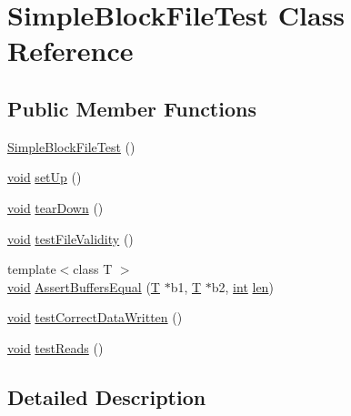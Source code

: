 \hypertarget{class_simple_block_file_test}{}\section{Simple\+Block\+File\+Test Class Reference}
\label{class_simple_block_file_test}
\subsection*{Public Member Functions}
\begin{DoxyCompactItemize}
\item 
\hyperlink{class_simple_block_file_test_ac1cdd7d75ba02dde184a2e5a5eed5441}{Simple\+Block\+File\+Test} ()
\item 
\hyperlink{sound_8c_ae35f5844602719cf66324f4de2a658b3}{void} \hyperlink{class_simple_block_file_test_ad88b8e92d60422a44a305d6705a2c918}{set\+Up} ()
\item 
\hyperlink{sound_8c_ae35f5844602719cf66324f4de2a658b3}{void} \hyperlink{class_simple_block_file_test_af9b32bbab86edb92e583258bad4e0ec7}{tear\+Down} ()
\item 
\hyperlink{sound_8c_ae35f5844602719cf66324f4de2a658b3}{void} \hyperlink{class_simple_block_file_test_a4f48c24ce1ec0f73a1391cc1c1a63fb9}{test\+File\+Validity} ()
\item 
{\footnotesize template$<$class T $>$ }\\\hyperlink{sound_8c_ae35f5844602719cf66324f4de2a658b3}{void} \hyperlink{class_simple_block_file_test_ad32bf5601eac184b7420fbe82bef32d2}{Assert\+Buffers\+Equal} (\hyperlink{xmltchar_8h_a16a0f7e7053a679c9bf4289b441a2be7}{T} $\ast$b1, \hyperlink{xmltchar_8h_a16a0f7e7053a679c9bf4289b441a2be7}{T} $\ast$b2, \hyperlink{xmltok_8h_a5a0d4a5641ce434f1d23533f2b2e6653}{int} \hyperlink{lib_2expat_8h_af86d325fecfc8f47b61fbf5a5146f582}{len})
\item 
\hyperlink{sound_8c_ae35f5844602719cf66324f4de2a658b3}{void} \hyperlink{class_simple_block_file_test_a526646ae1907562be454821c9792bfb0}{test\+Correct\+Data\+Written} ()
\item 
\hyperlink{sound_8c_ae35f5844602719cf66324f4de2a658b3}{void} \hyperlink{class_simple_block_file_test_ace8eb5cfb40373def957840923788a67}{test\+Reads} ()
\end{DoxyCompactItemize}


\subsection{Detailed Description}


